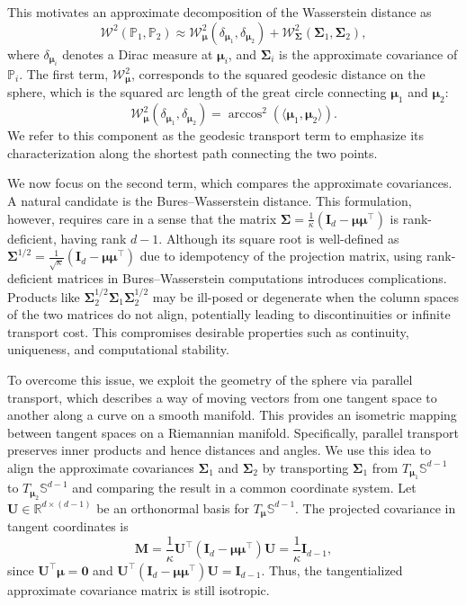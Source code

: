 \documentclass[10pt]{article}
\newcommand{\bfmu}{\boldsymbol{\mu}}
\newcommand{\bfM}{\boldsymbol{M}}
\newcommand{\bfI}{\boldsymbol{I}}
\newcommand{\bfU}{\boldsymbol{U}}
\newcommand{\bfSigma}{\boldsymbol{\Sigma}}
\newcommand{\bbP}{\mathbb{P}}
\newcommand{\bbR}{\mathbb{R}}
\newcommand{\bbS}{\mathbb{S}}
\newcommand{\calW}{\mathcal{W}}
\begin{document}
This motivates an approximate decomposition of the Wasserstein distance as \begin{equation}\label{def-vMF-wasserstein-decomposition} \calW^2 (\bbP_1, \bbP_2) \approx \calW_{\bfmu}^2 (\delta_{\bfmu_1}, \delta_{\bfmu_2}) + \calW_{\bfSigma}^2 (\bfSigma_1, \bfSigma_2), \end{equation} where $\delta_{\bfmu_i}$ denotes a Dirac measure at $\bfmu_i$, and $\bfSigma_i$ is the approximate covariance of $\bbP_i$. The first term, $\calW_{\bfmu}^2$, corresponds to the squared geodesic distance on the sphere, which is the squared arc length of the great circle connecting $\bfmu_1$ and $\bfmu_2$:
\begin{equation*}
	\calW_{\bfmu}^2 (\delta_{\bfmu_1}, \delta_{\bfmu_2}) = \arccos^2 (\langle \bfmu_1, \bfmu_2 \rangle).
\end{equation*}
We refer to this component as the geodesic transport term to emphasize its characterization along the shortest path connecting the two points.


We now focus on the second term, which compares the approximate covariances. A natural candidate is the Bures–Wasserstein distance. This formulation, however, requires care in a sense that the matrix $\bfSigma = \frac{1}{\kappa}(\bfI_d - \bfmu \bfmu^\top)$ is rank-deficient, having rank $d-1$. Although its square root is well-defined as $\bfSigma^{1/2} = \frac{1}{\sqrt{\kappa}}(\bfI_d - \bfmu \bfmu^\top)$ due to idempotency of the projection matrix, using rank-deficient matrices in Bures–Wasserstein computations introduces complications. Products like $\bfSigma_2^{1/2} \bfSigma_1 \bfSigma_2^{1/2}$ may be ill-posed or degenerate when the column spaces of the two matrices do not align, potentially leading to discontinuities or infinite transport cost. This compromises desirable properties such as continuity, uniqueness, and computational stability.

To overcome this issue, we exploit the geometry of the sphere via parallel transport, which describes a way of moving vectors from one tangent space to another along a curve on a smooth manifold. This provides an isometric mapping between tangent spaces on a Riemannian manifold. Specifically, parallel transport preserves inner products and hence distances and angles. We use this idea to align the approximate covariances $\bfSigma_1$ and $\bfSigma_2$ by transporting $\bfSigma_1$ from $T_{\bfmu_1} \bbS^{d-1}$ to $T_{\bfmu_2} \bbS^{d-1}$ and comparing the result in a common coordinate system. Let $\bfU \in \bbR^{d \times (d-1)}$ be an orthonormal basis for $T_{\bfmu} \bbS^{d-1}$. The projected covariance in tangent coordinates is
\begin{equation*}
	\bfM = \frac{1}{\kappa} \bfU^\top (\bfI_d - \bfmu \bfmu^\top) \bfU = \frac{1}{\kappa} \bfI_{d-1},
\end{equation*}
since $\bfU^\top \bfmu = \boldsymbol{0}$ and $\bfU^\top (\bfI_d - \bfmu \bfmu^\top) \bfU = \bfI_{d-1}$. Thus, the tangentialized approximate covariance matrix is still isotropic.
\end{document}
